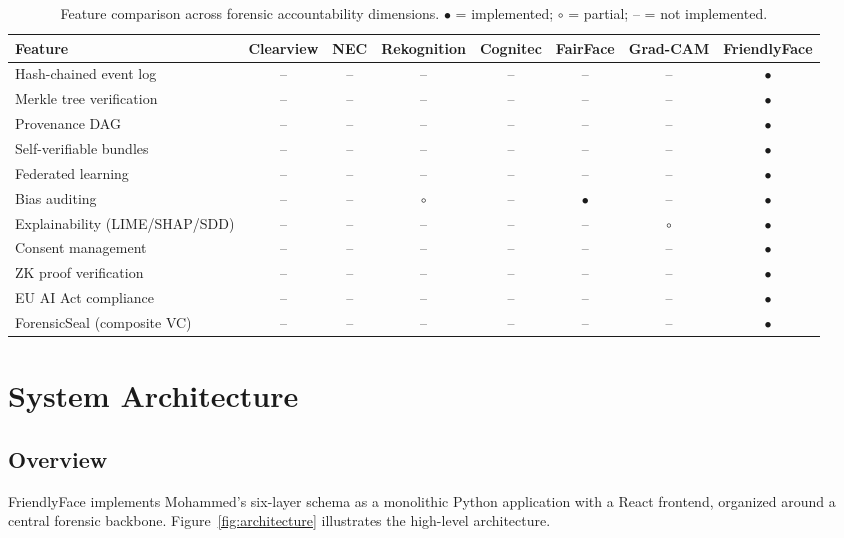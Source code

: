 \documentclass[conference]{IEEEtran}
\begin{document}
\begin{table}[t]
\centering
\caption{Feature comparison across forensic accountability dimensions. $\bullet$ = implemented; $\circ$ = partial; -- = not implemented.}
\label{tab:comparison}
\begin{tabular}{lccccccc}
\toprule
\textbf{Feature} & \textbf{Clearview} & \textbf{NEC} & \textbf{Rekognition} & \textbf{Cognitec} & \textbf{FairFace} & \textbf{Grad-CAM} & \textbf{FriendlyFace} \\
\midrule
Hash-chained event log & -- & -- & -- & -- & -- & -- & $\bullet$ \\
Merkle tree verification & -- & -- & -- & -- & -- & -- & $\bullet$ \\
Provenance DAG & -- & -- & -- & -- & -- & -- & $\bullet$ \\
Self-verifiable bundles & -- & -- & -- & -- & -- & -- & $\bullet$ \\
Federated learning & -- & -- & -- & -- & -- & -- & $\bullet$ \\
Bias auditing & -- & -- & $\circ$ & -- & $\bullet$ & -- & $\bullet$ \\
Explainability (LIME/SHAP/SDD) & -- & -- & -- & -- & -- & $\circ$ & $\bullet$ \\
Consent management & -- & -- & -- & -- & -- & -- & $\bullet$ \\
ZK proof verification & -- & -- & -- & -- & -- & -- & $\bullet$ \\
EU AI Act compliance & -- & -- & -- & -- & -- & -- & $\bullet$ \\
ForensicSeal (composite VC) & -- & -- & -- & -- & -- & -- & $\bullet$ \\
\bottomrule
\end{tabular}
\end{table}

\section{System Architecture}

\subsection{Overview}

FriendlyFace implements Mohammed's six-layer schema as a monolithic Python application with a React frontend, organized around a central forensic backbone. Figure~\ref{fig:architecture} illustrates the high-level architecture.
\end{document}

